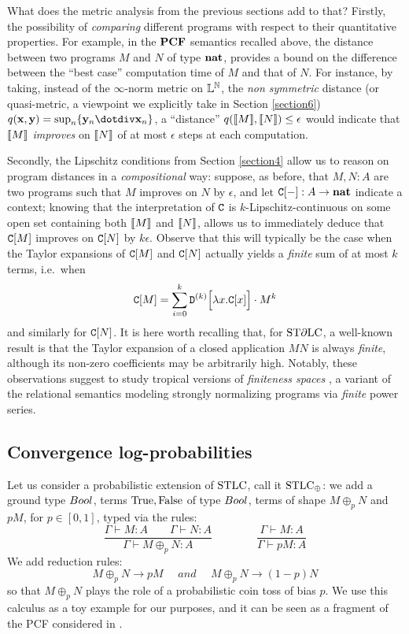 What does the metric analysis from the previous sections add to that? Firstly, the possibility of \emph{comparing} different programs with respect to their quantitative properties. For example, in the $\mathbf{PCF}$ semantics recalled above, the distance between two programs $M$ and $N$ of type $\mathbf{nat}$, provides a bound on the difference between the  ``best case'' computation time of $M$ and that of $N$. For instance, by taking, instead of the $\infty$-norm metric on $\mathbb{L}^{\mathbb{N}}$,  
the \emph{non symmetric} distance (or quasi-metric, a viewpoint we explicitly take in Section \ref{section6}) $q(\B x, \B y)=\sup_{n}\{\B y_{n}\dotdiv \B x_{n}\}$, a ``distance'' $q(\llbracket M\rrbracket,\llbracket N\rrbracket)\leq \epsilon$ would indicate that $\llbracket M\rrbracket$ \emph{improves} on $\llbracket N\rrbracket$ of at most $\epsilon$ steps at each computation. 

Secondly, the Lipschitz conditions from Section \ref{section4} allow us to reason on program distances in a \emph{compositional} way: suppose, as before, that $M,N:A$ are two programs such that $M$ improves on $N$ by $\epsilon$, and let $\mathtt{C}[-]:A \to \mathbf{nat}$ indicate a context; knowing that the interpretation of $\mathtt{C}$ is $k$-Lipschitz-continuous on some open set containing both $\llbracket M\rrbracket$ and $\llbracket N\rrbracket$, allows us to immediately deduce that $\mathtt{C}[M]$ improves on $\mathtt{C}[N]$ by $k \epsilon$. 
Observe that this will typically be the case when the Taylor expansions of $\mathtt{C}[M]$ and $\mathtt{C}[N]$ actually yields a \emph{finite} sum of at most $k$ terms, i.e.~when 
\begin{align}
\mathtt{C}[M] = \sum_{i=0}^{k} \mathtt{D}^{(k)}\Big[\lambda x.\mathtt{C}[x]\Big]\cdot M^{k}
\end{align}
and similarly for $\mathtt{C}[N]$. It is here worth recalling that, for $\mathrm{ST}\partial\mathrm{LC}$, a well-known result \cite{difflambda} is that the Taylor expansion of a closed application $MN$ is always \emph{finite}, although its non-zero coefficients may be arbitrarily high. 
Notably, these observations suggest to study tropical versions of \emph{finiteness spaces} \cite{Ehrhard2005}, 
a variant of the relational semantics modeling strongly normalizing programs via \emph{finite} power series.


\subsection{Convergence log-probabilities}


Let us consider a probabilistic extension of $\mathrm{STLC}$, call it $\mathrm{STLC}_\oplus$:
we add a ground type $\bool$, terms $\mathrm{True},\mathrm{False}$ of type $\bool$, terms of shape $M\oplus_p N$ and $pM$, for $p\in[0,1]$, typed via the rules:
\[
 \dfrac{\Gamma\vdash M:A \qquad \Gamma\vdash N:A}{\Gamma\vdash M\oplus_p N:A} 
 \qquad\qquad
 \dfrac{\Gamma\vdash M:A}{\Gamma\vdash pM:A}
\]
We add reduction rules:
\[
 M\oplus_p N \to pM \quad \textit{ and } \quad M\oplus_p N \to (1-p)N
\]
so that $M\oplus_p N$ plays the role of a probabilistic coin toss of bias $p$.
We use this calculus as a toy example for our purposes, and it can be seen as a fragment of the PCF considered in \cite{Manzo2013}.

